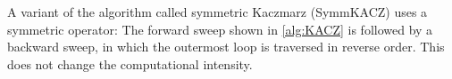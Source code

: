 A variant of the algorithm called symmetric Kaczmarz (\acrshort{SymmKACZ}) uses a symmetric operator: The  forward sweep shown in \cref{alg:KACZ} is followed by a backward sweep, in which the outermost loop is traversed in reverse order.
This does not change the computational intensity.

